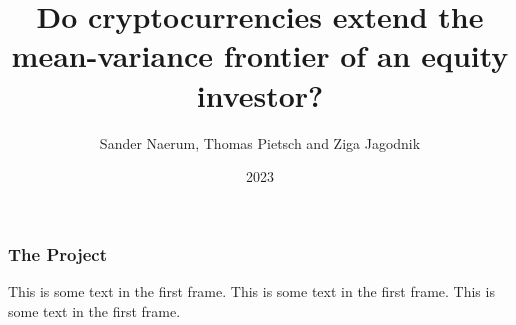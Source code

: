 \documentclass{beamer}
\title{Do cryptocurrencies extend the mean-variance frontier of an equity investor?}
\author{Sander Naerum, Thomas Pietsch and Ziga Jagodnik}
\institute{UZH}
\date{2023}
\begin{document}
\frame{\titlepage}

\begin{frame}
\frametitle{The Project}
This is some text in the first frame. This is some text in the first frame. This is some text in the first frame.
\end{frame}
\end{document}
